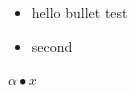 \documentclass[10pt]{article}
\begin{document}
\begin{itemize}
\item hello bullet test
\item second
\end{itemize}
$\alpha \bullet x$
\end{document}
